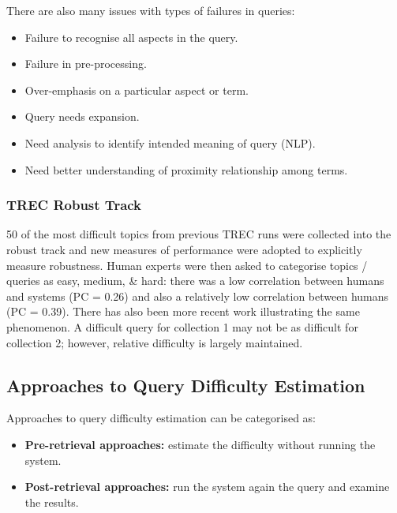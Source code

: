 \documentclass[a4paper,11pt]{article}
\begin{document}
There are also many issues with types of failures in queries:
\begin{itemize}
    \item   Failure to recognise all aspects in the query.
    \item   Failure in pre-processing.
    \item   Over-emphasis on a particular aspect or term.
    \item   Query needs expansion.
    \item   Need analysis to identify intended meaning of query (NLP).
    \item   Need better understanding of proximity relationship among terms.
\end{itemize}

\subsubsection{TREC Robust Track}
50 of the most difficult topics from previous TREC runs were collected into the robust track and new measures of performance were adopted to explicitly measure robustness.
Human experts were then asked to categorise topics / queries as easy, medium, \& hard:
there was a low correlation between humans and systems (PC = 0.26) and also a relatively low correlation between humans (PC = 0.39).
There has also been more recent work illustrating the same phenomenon.
A difficult query for collection 1 may not be as difficult for collection 2; however, relative difficulty is largely maintained.

\subsection{Approaches to Query Difficulty Estimation}
Approaches to query difficulty estimation can be categorised as:
\begin{itemize}
    \item   \textbf{Pre-retrieval approaches:} estimate the difficulty without running the system.
    \item   \textbf{Post-retrieval approaches:} run the system again the query and examine the results.
\end{itemize}
\end{document}
